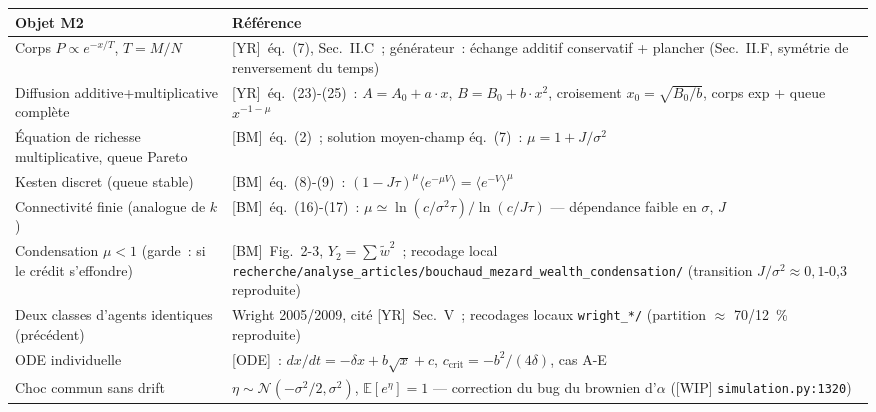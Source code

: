 \documentclass[11pt,a4paper]{article}
\begin{document}
\begin{xltabular}{\linewidth}{@{}>{\raggedright\arraybackslash}p{5.4cm}X@{}}
\toprule
Objet M2 & Référence \\
\midrule
\endhead
Corps $P\propto e^{-x/T}$, $T=M/N$ & [YR]~éq.~(7), Sec.~II.C~; générateur~: échange additif conservatif + plancher (Sec.~II.F, symétrie de renversement du temps) \\
Diffusion additive+multiplicative complète & [YR]~éq.~(23)-(25)~: $A=A_0+a\cdot x$, $B=B_0+b\cdot x^2$, croisement $x_0=\sqrt{B_0/b}$, corps exp + queue $x^{-1-\mu}$ \\
Équation de richesse multiplicative, queue Pareto & [BM]~éq.~(2)~; solution moyen-champ éq.~(7)~: $\mu=1+J/\sigma^2$ \\
Kesten discret (queue stable) & [BM]~éq.~(8)-(9)~: $(1-J\tau)^\mu\langle e^{-\mu V}\rangle = \langle e^{-V}\rangle^\mu$ \\
Connectivité finie (analogue de $k$) & [BM]~éq.~(16)-(17)~: $\mu\simeq \ln(c/\sigma^2\tau)/\ln(c/J\tau)$ --- dépendance faible en $\sigma$, $J$ \\
Condensation $\mu<1$ (garde~: si le crédit s'effondre) & [BM]~Fig.~2-3, $Y_2=\sum\tilde w^2$~; recodage local \texttt{recherche/analyse_articles/bouchaud_mezard_wealth_condensation/} (transition $J/\sigma^2\approx 0{,}1$-0,3 reproduite) \\
Deux classes d'agents identiques (précédent) & Wright 2005/2009, cité [YR]~Sec.~V~; recodages locaux \texttt{wright_*/} (partition $\approx$ 70/12~\% reproduite) \\
ODE individuelle & [ODE]~: $dx/dt=-\delta x+b\sqrt{x}+c$, $c_{\mathrm{crit}}=-b^2/(4\delta)$, cas A-E \\
Choc commun sans drift & $\eta\sim\mathcal N(-\sigma^2/2,\sigma^2)$, $\mathbb E[e^\eta]=1$ --- correction du bug du brownien d'$\alpha$ ([WIP] \texttt{simulation.py:1320}) \\
\bottomrule
\end{xltabular}
\end{document}
